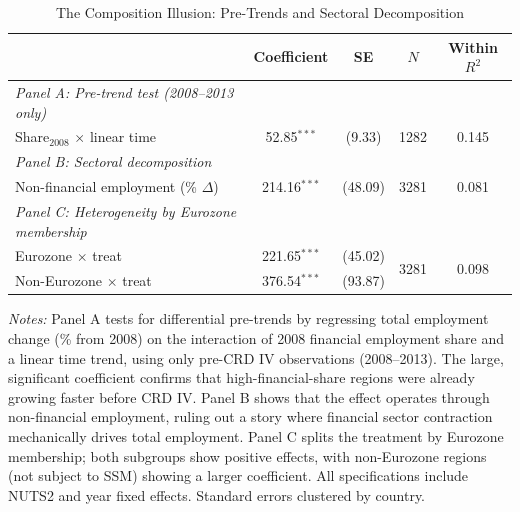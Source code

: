 \begin{table}[t]
\centering
\caption{The Composition Illusion: Pre-Trends and Sectoral Decomposition}
\label{tab:pretrends}
\begin{threeparttable}
\begin{tabular}{lcccc}
\toprule
 & Coefficient & SE & $N$ & Within $R^2$ \\
\midrule
\emph{Panel A: Pre-trend test (2008--2013 only)} \\
\addlinespace
Share$_{2008}$ $\times$ linear time & 52.85$^{***}$ & (9.33) & 1282 & 0.145 \\
\addlinespace
\emph{Panel B: Sectoral decomposition} \\
\addlinespace
Non-financial employment (\% $\Delta$) & 214.16$^{***}$ & (48.09) & 3281 & 0.081 \\
\addlinespace
\emph{Panel C: Heterogeneity by Eurozone membership} \\
\addlinespace
Eurozone $\times$ treat & 221.65$^{***}$ & (45.02) & \multirow{2}{*}{3281} & \multirow{2}{*}{0.098} \\
Non-Eurozone $\times$ treat & 376.54$^{***}$ & (93.87) & & \\
\bottomrule
\end{tabular}
\begin{tablenotes}[flushleft]\footnotesize
\item \textit{Notes:} Panel A tests for differential pre-trends by regressing total employment change (\% from 2008) on the interaction of 2008 financial employment share and a linear time trend, using only pre-CRD IV observations (2008--2013). The large, significant coefficient confirms that high-financial-share regions were already growing faster before CRD IV. Panel B shows that the effect operates through non-financial employment, ruling out a story where financial sector contraction mechanically drives total employment. Panel C splits the treatment by Eurozone membership; both subgroups show positive effects, with non-Eurozone regions (not subject to SSM) showing a larger coefficient. All specifications include NUTS2 and year fixed effects. Standard errors clustered by country.
\end{tablenotes}
\end{threeparttable}
\end{table}

